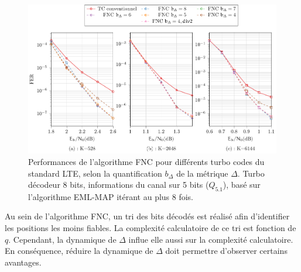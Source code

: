 

\begin{figure}[!t]
	\hspace*{-.075\textwidth}
	\includegraphics[width=1.1\textwidth]{main/ch4_fig/final/tikz_last/fnc10_format_8b.pdf}
	\caption{Performances de l'algorithme FNC pour différents turbo codes du standard LTE, selon la quantification $b_{\Delta}$ 
	de la métrique $\Delta$.
	Turbo décodeur 8 bits, informations du canal sur 5 bits ($Q_{5.1}$), basé sur l'algorithme EML-MAP itérant au plus 8 fois.
	\label{fig:fnc_format_8b}}
\end{figure}

Au sein de l'algorithme FNC, un tri des bits décodés est réalisé afin d'identifier les positions les moins fiables. La
complexité calculatoire de ce tri est fonction de $q$. Cependant, la dynamique de $\Delta$ influe elle aussi sur la
complexité calculatoire. En conséquence, réduire la dynamique de $\Delta$ doit permettre d'observer certains avantages.

